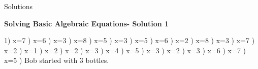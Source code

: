 \documentclass{article}%
\begin{document}
%
\newline%
\newline%
\newline%
\pagebreak%
\huge%
\vspace*{\fill}%
\begin{center}%
Solutions%
\end{center}%
\vspace*{\fill}%
\normalsize%
\pagebreak%
\large%
\begin{center}%
\textbf{Solving Basic Algebraic Equations- Solution 1}%
\newline%
\end{center} \normalsize%
1) x=7%
) x=6%
) x=3%
) x=8%
) x=5%
) x=3%
) x=5%
) x=6%
) x=2%
) x=8%
) x=3%
) x=7%
) x=2%
) x=1%
) x=2%
) x=2%
) x=3%
) x=4%
) x=5%
) x=3%
) x=2%
) x=3%
) x=6%
) x=7%
) x=5%
) Bob started with 3 bottles.%
\newline%
\end{document}
